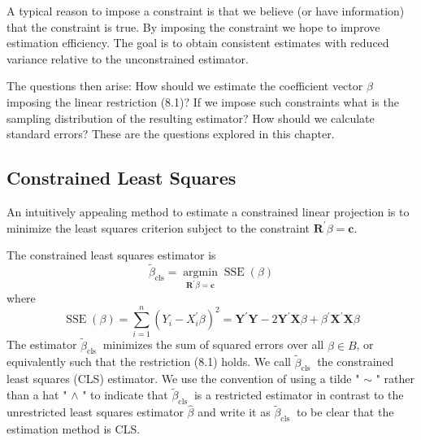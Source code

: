 \documentclass[10pt]{article}
\begin{document}
A typical reason to impose a constraint is that we believe (or have information) that the constraint is true. By imposing the constraint we hope to improve estimation efficiency. The goal is to obtain consistent estimates with reduced variance relative to the unconstrained estimator.

The questions then arise: How should we estimate the coefficient vector $\beta$ imposing the linear restriction (8.1)? If we impose such constraints what is the sampling distribution of the resulting estimator? How should we calculate standard errors? These are the questions explored in this chapter.

\subsection{Constrained Least Squares}
An intuitively appealing method to estimate a constrained linear projection is to minimize the least squares criterion subject to the constraint $\boldsymbol{R}^{\prime} \beta=\boldsymbol{c}$.

The constrained least squares estimator is
$$
\widetilde{\beta}_{\mathrm{cls}}=\underset{\boldsymbol{R}^{\prime} \beta=\boldsymbol{c}}{\operatorname{argmin}} \operatorname{SSE}(\beta)
$$
where
$$
\operatorname{SSE}(\beta)=\sum_{i=1}^{n}\left(Y_{i}-X_{i}^{\prime} \beta\right)^{2}=\boldsymbol{Y}^{\prime} \boldsymbol{Y}-2 \boldsymbol{Y}^{\prime} \boldsymbol{X} \beta+\beta^{\prime} \boldsymbol{X}^{\prime} \boldsymbol{X} \beta
$$
The estimator $\widetilde{\beta}_{\text {cls }}$ minimizes the sum of squared errors over all $\beta \in B$, or equivalently such that the restriction (8.1) holds. We call $\widetilde{\beta}_{\text {cls }}$ the constrained least squares (CLS) estimator. We use the convention of using a tilde " $\sim$ " rather than a hat " $\wedge$ " to indicate that $\widetilde{\beta}_{\text {cls }}$ is a restricted estimator in contrast to the unrestricted least squares estimator $\widehat{\beta}$ and write it as $\widetilde{\beta}_{\text {cls }}$ to be clear that the estimation method is CLS.
\end{document}
